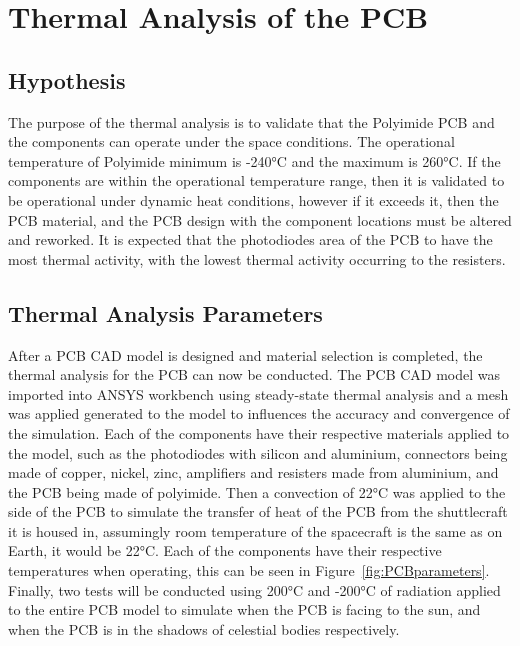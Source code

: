 \section{Thermal Analysis of the PCB}

\subsection{Hypothesis}
The purpose of the thermal analysis is to validate that the Polyimide
PCB and the components can operate under the space conditions. The
operational temperature of Polyimide minimum is -240°C and the maximum
is 260°C. If the components are within the operational temperature
range, then it is validated to be operational under dynamic heat
conditions, however if it exceeds it, then the PCB material, and the PCB
design with the component locations must be altered and reworked. It is
expected that the photodiodes area of the PCB to have the most thermal
activity, with the lowest thermal activity occurring to the resisters.

\subsection{Thermal Analysis Parameters}
After a PCB CAD model is designed and material selection is completed,
the thermal analysis for the PCB can now be conducted. The PCB CAD model
was imported into ANSYS workbench using steady-state thermal analysis
and a mesh was applied generated to the model to influences the accuracy
and convergence of the simulation. Each of the components have their
respective materials applied to the model, such as the photodiodes with
silicon and aluminium, connectors being made of copper, nickel, zinc,
amplifiers and resisters made from aluminium, and the PCB being made of
polyimide. Then a convection of 22°C was applied to the side of the PCB
to simulate the transfer of heat of the PCB from the shuttlecraft it is
housed in, assumingly room temperature of the spacecraft is the same as
on Earth, it would be 22°C. Each of the components have their respective
temperatures when operating, this can be seen in Figure~\ref{fig:PCBparameters}. Finally, two tests will be conducted using
200°C and -200°C of radiation applied to the entire PCB model to
simulate when the PCB is facing to the sun, and when the PCB is in the
shadows of celestial bodies respectively.

